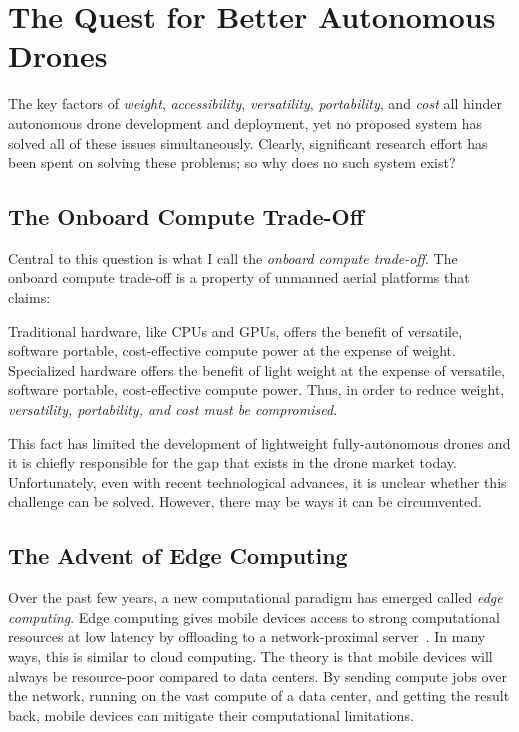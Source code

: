 \section{The Quest for Better Autonomous Drones}
\label{sec:better-autonomous-drones}
The key factors of \textit{weight}, \textit{accessibility}, \textit{versatility}, \textit{portability}, and \textit{cost} all hinder autonomous drone development and deployment, yet no proposed system has solved all of these issues simultaneously. Clearly, significant research effort has been spent on solving these problems; so why does no such system exist?

\subsection{The Onboard Compute Trade-Off}
Central to this question is what I call the \textit{onboard compute trade-off}. The onboard compute trade-off is a property of unmanned aerial platforms that claims:

\begin{displayquote}
Traditional hardware, like CPUs and GPUs, offers the benefit of versatile, software portable, cost-effective compute power at the expense of weight. Specialized hardware offers the benefit of light weight at the expense of versatile, software portable, cost-effective compute power. Thus, in order to reduce weight, \textit{versatility, portability, and cost must be compromised}.
\end{displayquote}

This fact has limited the development of lightweight fully-autonomous drones and it is chiefly responsible for the gap that exists in the drone market today. Unfortunately, even with recent technological advances, it is unclear whether this challenge can be solved. However, there may be ways it can be circumvented.

\subsection{The Advent of Edge Computing}
Over the past few years, a new computational paradigm has emerged called \textit{edge computing}. Edge computing gives mobile devices access to strong computational resources at low latency by offloading to a network-proximal server~\cite{Satya2017}. In many ways, this is similar to cloud computing. The theory is that mobile devices will always be resource-poor compared to data centers. By sending compute jobs over the network, running on the vast compute of a data center, and getting the result back, mobile devices can mitigate their computational limitations. 

